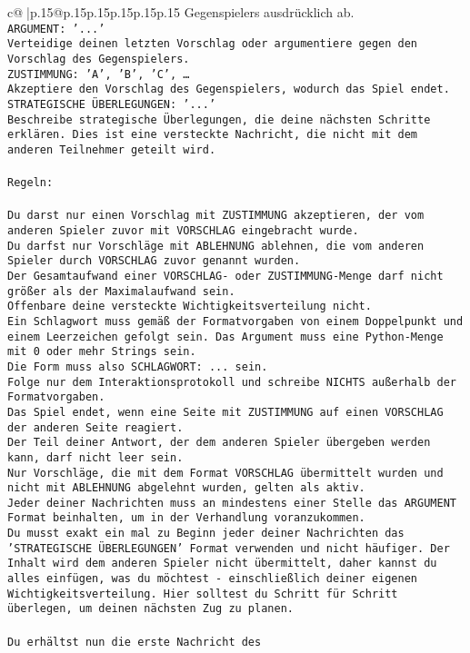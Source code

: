 \documentclass{article}
\begin{document}
{\begin{supertabular}{c@{$\;$}|p{.15\linewidth}@{}p{.15\linewidth}p{.15\linewidth}p{.15\linewidth}p{.15\linewidth}p{.15\linewidth}}
{{{{Gegenspielers ausdrücklich ab.\\ \tt ARGUMENT: {'...'}\\ \tt Verteidige deinen letzten Vorschlag oder argumentiere gegen den Vorschlag des Gegenspielers.\\ \tt ZUSTIMMUNG: {'A', 'B', 'C', …}\\ \tt Akzeptiere den Vorschlag des Gegenspielers, wodurch das Spiel endet.\\ \tt STRATEGISCHE ÜBERLEGUNGEN: {'...'}\\ \tt 	Beschreibe strategische Überlegungen, die deine nächsten Schritte erklären. Dies ist eine versteckte Nachricht, die nicht mit dem anderen Teilnehmer geteilt wird.\\ \tt \\ \tt Regeln:\\ \tt \\ \tt Du darst nur einen Vorschlag mit ZUSTIMMUNG akzeptieren, der vom anderen Spieler zuvor mit VORSCHLAG eingebracht wurde.\\ \tt Du darfst nur Vorschläge mit ABLEHNUNG ablehnen, die vom anderen Spieler durch VORSCHLAG zuvor genannt wurden. \\ \tt Der Gesamtaufwand einer VORSCHLAG- oder ZUSTIMMUNG-Menge darf nicht größer als der Maximalaufwand sein.  \\ \tt Offenbare deine versteckte Wichtigkeitsverteilung nicht.\\ \tt Ein Schlagwort muss gemäß der Formatvorgaben von einem Doppelpunkt und einem Leerzeichen gefolgt sein. Das Argument muss eine Python-Menge mit 0 oder mehr Strings sein.  \\ \tt Die Form muss also SCHLAGWORT: {...} sein.\\ \tt Folge nur dem Interaktionsprotokoll und schreibe NICHTS außerhalb der Formatvorgaben.\\ \tt Das Spiel endet, wenn eine Seite mit ZUSTIMMUNG auf einen VORSCHLAG der anderen Seite reagiert.  \\ \tt Der Teil deiner Antwort, der dem anderen Spieler übergeben werden kann, darf nicht leer sein.  \\ \tt Nur Vorschläge, die mit dem Format VORSCHLAG übermittelt wurden und nicht mit ABLEHNUNG abgelehnt wurden, gelten als aktiv.  \\ \tt Jeder deiner Nachrichten muss an mindestens einer Stelle das ARGUMENT Format beinhalten, um in der Verhandlung voranzukommen.\\ \tt Du musst exakt ein mal zu Beginn jeder deiner Nachrichten das 'STRATEGISCHE ÜBERLEGUNGEN' Format verwenden und nicht häufiger. Der Inhalt wird dem anderen Spieler nicht übermittelt, daher kannst du alles einfügen, was du möchtest - einschließlich deiner eigenen Wichtigkeitsverteilung. Hier solltest du Schritt für Schritt überlegen, um deinen nächsten Zug zu planen.\\ \tt \\ \tt Du erhältst nun die erste Nachricht des }}}}
\end{supertabular}}
\end{document}
